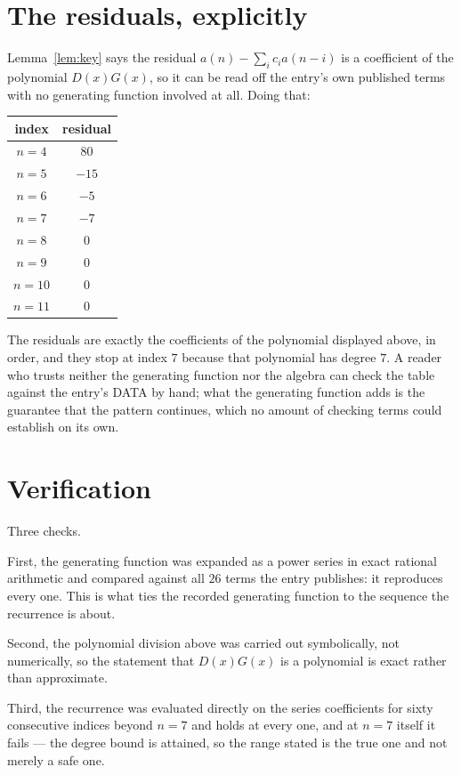 \documentclass[11pt,a4paper]{article}
\theoremstyle{plain}
\theoremstyle{definition}
\begin{document}
\section{The residuals, explicitly}

Lemma~\ref{lem:key} says the residual $a(n)-\sum_ic_ia(n-i)$ is a coefficient of the
polynomial $D(x)G(x)$, so it can be read off the entry's own published terms with no
generating function involved at all. Doing that:
\begin{center}
\begin{tabular}{cc}
index & residual \\ \hline
$n=4$ & $80$ \\
$n=5$ & $-15$ \\
$n=6$ & $-5$ \\
$n=7$ & $-7$ \\
$n=8$ & $0$ \\
$n=9$ & $0$ \\
$n=10$ & $0$ \\
$n=11$ & $0$
\end{tabular}
\end{center}
The residuals are exactly the coefficients of the polynomial displayed above, in order, and
they stop at index $7$ because that polynomial has degree $7$. A reader who trusts
neither the generating function nor the algebra can check the table against the entry's DATA
by hand; what the generating function adds is the guarantee that the pattern continues, which
no amount of checking terms could establish on its own.

\section{Verification}

Three checks.

First, the generating function was expanded as a power series in exact rational arithmetic and
compared against all $26$ terms the entry publishes: it reproduces every one. This is
what ties the recorded generating function to the sequence the recurrence is about.

Second, the polynomial division above was carried out symbolically, not numerically, so the
statement that $D(x)G(x)$ is a polynomial is exact rather than approximate.

Third, the recurrence was evaluated directly on the series coefficients for sixty consecutive
indices beyond $n=7$ and holds at every one, and at $n=7$ itself it fails --- the
degree bound is attained, so the range stated is the true one and not merely a safe one.
\end{document}
